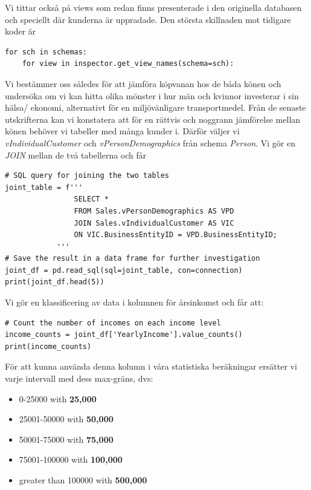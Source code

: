 \documentclass[]{article}
\begin{document}
Vi tittar också på views som redan finns presenterade i den originella databasen och speciellt där kunderna är uppradade. Den största skillnaden mot tidigare koder är
\begin{lstlisting}
for sch in schemas:
    for view in inspector.get_view_names(schema=sch):
\end{lstlisting}
Vi bestämmer oss således för att jämföra köpvanan hos de båda könen och undersöka om vi kan hitta olika mönster i hur män och kvinnor investerar i sin hälsa/ ekonomi, alternativt för en miljövänligare transportmedel. Från de senaste utskrifterna kan vi konstatera att för en rättvis och noggrann jämförelse mellan könen behöver vi tabeller med många kunder i. Därför väljer vi \emph{vIndividualCustomer} och \emph{vPersonDemographics} från schema \emph{Person}. Vi gör en \emph{JOIN} mellan de två tabellerna och får
\begin{lstlisting}
# SQL query for joining the two tables
joint_table = f'''
                SELECT *
                FROM Sales.vPersonDemographics AS VPD
                JOIN Sales.vIndividualCustomer AS VIC
                ON VIC.BusinessEntityID = VPD.BusinessEntityID;
            '''
# Save the result in a data frame for further investigation
joint_df = pd.read_sql(sql=joint_table, con=connection)
print(joint_df.head(5))
\end{lstlisting}
Vi gör en klassificering av data i kolumnen för årsinkomst och får att:
\begin{lstlisting}
# Count the number of incomes on each income level
income_counts = joint_df['YearlyIncome'].value_counts()
print(income_counts)
\end{lstlisting}
För att kunna använda denna kolumn i våra statistiska beräkningar ersätter vi varje intervall med dess max-gräns, dvs:
\begin{itemize}[topsep=10pt, partopsep=0pt, itemsep=0.2em, parsep=0pt]
	\item[] 0-25000 with \textbf{25,000}
	\item[] 25001-50000 with \textbf{50,000}
	\item[] 50001-75000 with \textbf{75,000}
	\item[] 75001-100000 with \textbf{100,000}
	\item[] greater than 100000 with \textbf{500,000}
\end{itemize}
\end{document}
